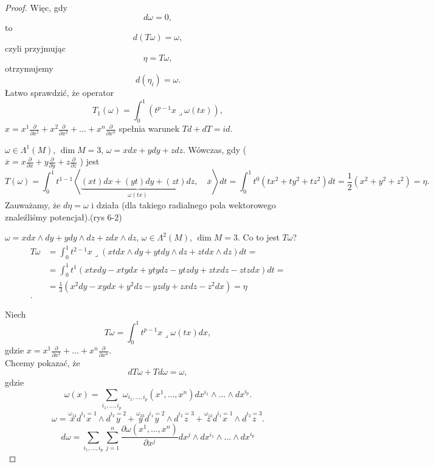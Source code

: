 \documentclass[../main.tex]{subfiles}
\begin{document}
\begin{proof}
    Więc, gdy
    \[
        d\omega = 0
    ,\]
to
    \[
        d(T\omega) = \omega
    ,\]
    czyli przyjmując
 \[
\eta = T\omega
,\]
otrzymujemy
\[
    d(\eta_i) = \omega
.\]
Łatwo sprawdzić, że operator
\[
    T_1(\omega) = \int_0^1\left(t^{p-1}x \lrcorner \omega(tx)\right)
,\]
$x = x^1 \frac{\partial }{\partial x^1} + x^2 \frac{\partial }{\partial x^2} + \ldots + x^n \frac{\partial }{\partial x^n}$ spełnia warunek $Td + dT = id$.
 \begin{przyklad}
     $\omega \in \Lambda^1(M)$, $\dim M = 3$, $\omega = xdx + ydy + zdz$. Wówczas, gdy ($\overline{x} = x \frac{\partial }{\partial x} + y \frac{\partial }{\partial y} + z \frac{\partial }{\partial z}$ ) jest
     \[
         T(\omega) = \int_0^1 t^{1-1} \left<\underbrace{(xt)dx + (yt)dy + (zt)dz}_{\omega(tx)},\quad \overline{x} \right>dt = \int_0^1t^0\left( tx^2 + ty^2 + tz^2 \right) dt = \frac{1}{2}\left( x^2 + y^2 + z^2 \right) = \eta
         .\]
     Zauważamy, że $d\eta = \omega$ i działa (dla takiego radialnego pola wektorowego znaleźliśmy potencjał).(rys 6-2)
\end{przyklad}
\begin{przyklad}
    $\omega = xdx\land dy + ydy\land dz + zdx\land dz$,  $\omega\in \Lambda^2(M)$, $\dim M = 3$.
    Co to jest $T\omega$?
    \begin{align*}
        T\omega &= \int_0^1t^{2-1} x \lrcorner \left( xt dx\land dy + yt dy\land dz + zt dx\land dz \right) dt = \\
        &= \int_0^1 t^1\left( xtx dy - xt ydx + yt ydz - ytzdy + ztxdz - ztzdx \right)dt = \\
        &= \frac{1}{3}\left( x^2dy - xydx + y^2dz - yzdy + zxdz - z^2dx \right) = \eta\\
    .\end{align*}
\end{przyklad}
Niech
\[
    T\omega = \int_0^1 t^{p-1} x \lrcorner \omega(tx)dx
,\]
gdzie $x = x^1 \frac{\partial }{\partial x^1} + \ldots + x^n \frac{\partial }{\partial x^n} $.\\
Chcemy pokazać, że
\[
dT\omega + Td\omega = \omega
,\]
gdzie
\[
    \omega(x) = \sum_{i_1, \ldots, i_p}\omega_{i_1, \ldots, i_p}(x^1, \ldots, x^n)dx^{i_1}\land \ldots\land dx^{i_p}
.\]
\[
    \omega = \overset{\omega_{12}}{x} d\overset{i_1 = 1}{x}\land d\overset{i_2 = 2}{y} + \overset{\omega_{23}}{y}d\overset{i_1 = 2}{y}\land d\overset{i_2 = 3}{z} + \overset{\omega_{13}}{z}d\overset{i_1 = 1}{x}\land d\overset{i_2 = 3}{z}
.\]
\[
    d\omega = \sum_{i_1,\ldots,i_p}\sum_{j=1}^n \frac{\partial \omega(x^1,\ldots,x^n)}{\partial x^j} dx^j\land dx^{i_1}\land \ldots \land dx^{i_p}
\]
\end{proof}
\end{document}
